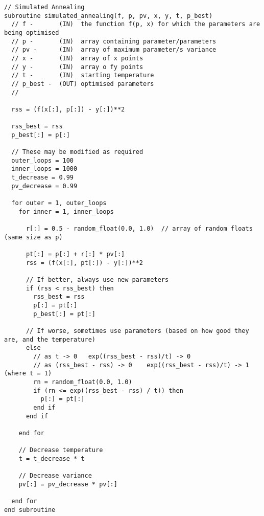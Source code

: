 \begin{lstlisting}[style=sPseudo,caption={Simple simulated annealing subroutine}]
// Simulated Annealing
subroutine simulated_annealing(f, p, pv, x, y, t, p_best)
  // f -       (IN)  the function f(p, x) for which the parameters are being optimised
  // p -       (IN)  array containing parameter/parameters
  // pv -      (IN)  array of maximum parameter/s variance
  // x -       (IN)  array of x points
  // y -       (IN)  array o fy points
  // t -       (IN)  starting temperature
  // p_best -  (OUT) optimised parameters
  //

  rss = (f(x[:], p[:]) - y[:])**2 
  
  rss_best = rss
  p_best[:] = p[:]
  
  // These may be modified as required
  outer_loops = 100
  inner_loops = 1000
  t_decrease = 0.99
  pv_decrease = 0.99
  
  for outer = 1, outer_loops
    for inner = 1, inner_loops
    
      r[:] = 0.5 - random_float(0.0, 1.0)  // array of random floats (same size as p)
      
      pt[:] = p[:] + r[:] * pv[:]
      rss = (f(x[:], pt[:]) - y[:])**2 
      
      // If better, always use new parameters
      if (rss < rss_best) then
        rss_best = rss
        p[:] = pt[:]
        p_best[:] = pt[:]
        
      // If worse, sometimes use parameters (based on how good they are, and the temperature)
      else      
        // as t -> 0   exp((rss_best - rss)/t) -> 0
        // as (rss_best - rss) -> 0    exp((rss_best - rss)/t) -> 1  (where t = 1) 
        rn = random_float(0.0, 1.0)
        if (rn <= exp((rss_best - rss) / t)) then
          p[:] = pt[:]
        end if
      end if     
      
    end for
    
    // Decrease temperature
    t = t_decrease * t
    
    // Decrease variance
    pv[:] = pv_decrease * pv[:]
    
  end for
end subroutine
\end{lstlisting}
